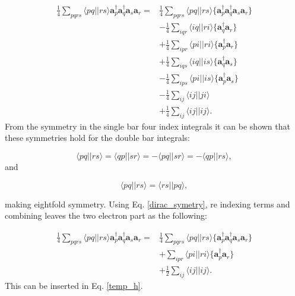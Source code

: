 \begin{align}
\frac{1}{4} \sum_{pqrs} \langle pq||rs \rangle \textbf{a}^{\dag}_p \textbf{a}^{\dag}_q \textbf{a}_s \textbf{a}_r = &
\frac{1}{4}
\sum_{pqrs} \langle pq||rs \rangle \{\textbf{a}^{\dag}_p \textbf{a}^{\dag}_q \textbf{a}_s \textbf{a}_r\}
\nonumber \\ &
- \frac{1}{4} \sum_{iqr} \langle iq||ri \rangle \{\textbf{a}^{\dag}_q \textbf{a}_r \} \nonumber \\ &
+ \frac{1}{4} \sum_{ipr} \langle pi||ri \rangle \{\textbf{a}^{\dag}_p \textbf{a}_r \} \nonumber \\ &
+ \frac{1}{4} \sum_{iqs} \langle iq||is \rangle \{\textbf{a}^{\dag}_q \textbf{a}_s \} \nonumber \\ &
- \frac{1}{4} \sum_{ips} \langle pi||is \rangle \{\textbf{a}^{\dag}_p \textbf{a}_s \} \nonumber \\ &
- \frac{1}{4} \sum_{ij} \langle ij||ji \rangle \nonumber \\ &
+ \frac{1}{4} \sum_{ij} \langle ij||ij \rangle . \nonumber
\end{align}
From the symmetry in the single bar four index integrals it can be shown that these symmetries hold for the double bar integrals:

\begin{equation}
\langle pq||rs \rangle =
\langle qp||sr \rangle =
- \langle pq||sr \rangle =
- \langle qp || rs \rangle , \label{dirac_symetry}
\end{equation}
and 

\begin{equation}
\langle pq || rs \rangle = \langle rs || pq \rangle ,
\end{equation}

making eightfold symmetry. Using Eq. \eqref{dirac_symetry}, re indexing terms and combining leaves the two electron part as the following:

\begin{align}
\frac{1}{4} \sum_{pqrs} \langle pq||rs \rangle \textbf{a}^{\dag}_p \textbf{a}^{\dag}_q \textbf{a}_s \textbf{a}_r = & \frac{1}{4}
\sum_{pqrs} \langle pq||rs \rangle \{\textbf{a}^{\dag}_p \textbf{a}^{\dag}_q \textbf{a}_s \textbf{a}_r\}
 \\ &
+ \sum_{ipr} \langle pi||ri \rangle \{\textbf{a}^{\dag}_p \textbf{a}_r \} \nonumber \\ &
+ \frac{1}{2} \sum_{ij} \langle ij||ij \rangle . \nonumber
\end{align}
This can be inserted in Eq. \eqref{temp_h}.

